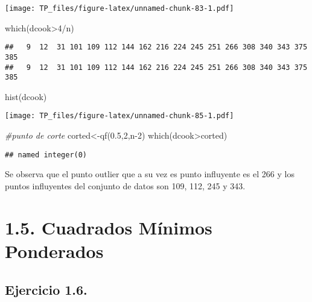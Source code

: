 \documentclass[
]{article}
\newenvironment{Shaded}{\begin{snugshade}}{\end{snugshade}}
\newcommand{\CommentTok}[1]{\textcolor[rgb]{0.56,0.35,0.01}{\textit{#1}}}
\newcommand{\DecValTok}[1]{\textcolor[rgb]{0.00,0.00,0.81}{#1}}
\newcommand{\FloatTok}[1]{\textcolor[rgb]{0.00,0.00,0.81}{#1}}
\newcommand{\FunctionTok}[1]{\textcolor[rgb]{0.00,0.00,0.00}{#1}}
\newcommand{\NormalTok}[1]{#1}
\newcommand{\OtherTok}[1]{\textcolor[rgb]{0.56,0.35,0.01}{#1}}
\newcommand{\SpecialCharTok}[1]{\textcolor[rgb]{0.00,0.00,0.00}{#1}}
\begin{document}
\texttt{[image: TP\_files/figure-latex/unnamed-chunk-83-1.pdf]}

\begin{Shaded}
\begin{Highlighting}[]
\FunctionTok{which}\NormalTok{(dcook}\SpecialCharTok{\textgreater{}}\DecValTok{4}\SpecialCharTok{/}\NormalTok{n)}
\end{Highlighting}
\end{Shaded}

\begin{verbatim}
##   9  12  31 101 109 112 144 162 216 224 245 251 266 308 340 343 375 385 
##   9  12  31 101 109 112 144 162 216 224 245 251 266 308 340 343 375 385
\end{verbatim}

\begin{Shaded}
\begin{Highlighting}[]
\FunctionTok{hist}\NormalTok{(dcook)}
\end{Highlighting}
\end{Shaded}

\texttt{[image: TP\_files/figure-latex/unnamed-chunk-85-1.pdf]}

\begin{Shaded}
\begin{Highlighting}[]
\CommentTok{\#punto de corte}
\NormalTok{corted}\OtherTok{\textless{}{-}}\FunctionTok{qf}\NormalTok{(}\FloatTok{0.5}\NormalTok{,}\DecValTok{2}\NormalTok{,n}\DecValTok{{-}2}\NormalTok{)}
\FunctionTok{which}\NormalTok{(dcook}\SpecialCharTok{\textgreater{}}\NormalTok{corted)}
\end{Highlighting}
\end{Shaded}

\begin{verbatim}
## named integer(0)
\end{verbatim}

Se observa que el punto outlier que a su vez es punto influyente es el
266 y los puntos influyentes del conjunto de datos son 109, 112, 245 y
343.

\hypertarget{cuadrados-muxednimos-ponderados}{%
\section{\texorpdfstring{{1.5. Cuadrados Mínimos
Ponderados}}{1.5. Cuadrados Mínimos Ponderados}}\label{cuadrados-muxednimos-ponderados}}

\hypertarget{ejercicio-1.6.}{%
\subsection{Ejercicio 1.6.}\label{ejercicio-1.6.}}
\end{document}
